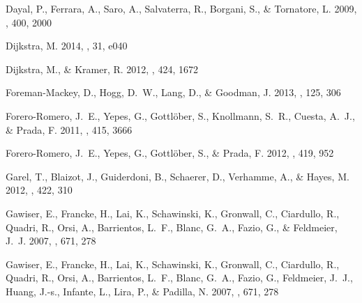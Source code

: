 \documentclass{emulateapj}
\begin{document}
\begin{thebibliography}{39}
{Dayal}, P., {Ferrara}, A., {Saro}, A., {Salvaterra}, R., {Borgani}, S., \&
  {Tornatore}, L. 2009, \mnras, 400, 2000

{Dijkstra}, M. 2014, \pasa, 31, e040

{Dijkstra}, M., \& {Kramer}, R. 2012, \mnras, 424, 1672

{Foreman-Mackey}, D., {Hogg}, D.~W., {Lang}, D., \& {Goodman}, J. 2013, \pasp,
  125, 306

{Forero-Romero}, J.~E., {Yepes}, G., {Gottl{\"o}ber}, S., {Knollmann}, S.~R.,
  {Cuesta}, A.~J., \& {Prada}, F. 2011, \mnras, 415, 3666

{Forero-Romero}, J.~E., {Yepes}, G., {Gottl{\"o}ber}, S., \& {Prada}, F. 2012,
  \mnras, 419, 952

{Garel}, T., {Blaizot}, J., {Guiderdoni}, B., {Schaerer}, D., {Verhamme}, A.,
  \& {Hayes}, M. 2012, \mnras, 422, 310

{Gawiser}, E., {Francke}, H., {Lai}, K., {Schawinski}, K., {Gronwall}, C.,
  {Ciardullo}, R., {Quadri}, R., {Orsi}, A., {Barrientos}, L.~F., {Blanc},
  G.~A., {Fazio}, G., \& {Feldmeier}, J.~J. 2007{}, \apj, 671, 278

{Gawiser}, E., {Francke}, H., {Lai}, K., {Schawinski}, K., {Gronwall}, C.,
  {Ciardullo}, R., {Quadri}, R., {Orsi}, A., {Barrientos}, L.~F., {Blanc},
  G.~A., {Fazio}, G., {Feldmeier}, J.~J., {Huang}, J.-s., {Infante}, L.,
  {Lira}, P., \& {Padilla}, N. 2007{}, \apj, 671, 278


\end{thebibliography}
\end{document}
